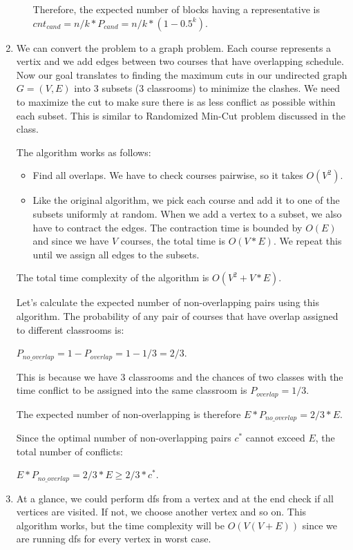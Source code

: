 \documentclass{article}
\begin{document}
\begin{enumerate}
\begin{enumerate}
    Therefore, the expected number of blocks having a representative is $cnt_{cand}=n/k*P_{cand}=n/k*(1-0.5^k)$.
  \end{enumerate}

  \item We can convert the problem to a graph problem.
  Each course represents a vertix and we add edges between two courses that have overlapping schedule.
  Now our goal translates to finding the maximum cuts in our undirected graph $G=(V,E)$ into 3 subsets (3 classrooms) to minimize the clashes.
  We need to maximize the cut to make sure there is as less conflict as possible within each subset.
  This is similar to Randomized Min-Cut problem discussed in the class.

  The algorithm works as follows:

  \begin{itemize}
    \item Find all overlaps.
    We have to check courses pairwise, so it takes $O(V^2)$.
    \item Like the original algorithm, we pick each course and add it to one of the subsets uniformly at random.
    When we add a vertex to a subset, we also have to contract the edges.
    The contraction time is bounded by $O(E)$ and since we have $V$ courses, the total time is $O(V*E)$.
    We repeat this until we assign all edges to the subsets.
  \end{itemize}

  The total time complexity of the algorithm is $O(V^2+V*E)$.

  Let's calculate the expected number of non-overlapping pairs using this algorithm.
  The probability of any pair of courses that have overlap assigned to different classrooms is:

  $P_{no\_overlap}=1-P_{overlap}=1-1/3=2/3$.

  This is because we have 3 classrooms and the chances of two classes with the time conflict to be assigned into the same classroom is $P_{overlap}=1/3$.
  
  The expected number of non-overlapping is therefore $E*P_{no\_overlap}=2/3*E$.

  Since the optimal number of non-overlapping pairs $c^*$ cannot exceed $E$, the total number of conflicts:

  $E*P_{no\_overlap}=2/3*E\geq 2/3*c^*$.

  \item At a glance, we could perform dfs from a vertex and at the end check if all vertices are visited.
  If not, we choose another vertex and so on.
  This algorithm works, but the time complexity will be $O(V(V+E))$ since we are running dfs for every vertex in worst case.


\end{enumerate}
\end{document}
